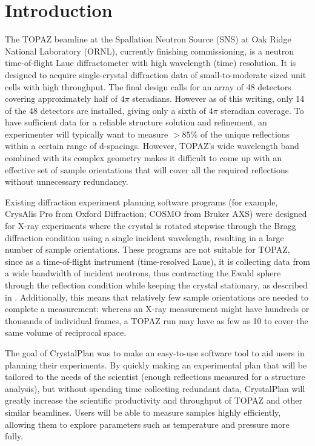 \documentclass[final]{iucr}              %
\begin{document}
\section{Introduction}

The TOPAZ beamline at the Spallation Neutron Source (SNS) at Oak Ridge National
Laboratory (ORNL), currently finishing commissioning, is a neutron
time-of-flight Laue diffractometer with high wavelength (time) resolution. It
is designed to acquire single-crystal diffraction data of small-to-moderate sized unit cells with  high
throughput. The final design calls for an array of 48 detectors covering
approximately half of $4\pi$ steradians. However as of this writing, only 14 of
the 48 detectors are installed, giving only a sixth of $4\pi$ steradian
coverage. To have sufficient data for a reliable structure solution and  
refinement, an experimenter will typically want to measure $ > 85\%$ of the
unique reflections within a certain range of d-spacings. However, TOPAZ's wide 
wavelength band combined with its complex geometry makes it difficult to come up
with  an effective set of sample orientations that will cover all the required
reflections without unnecessary redundancy. 


Existing diffraction experiment planning software programs (for example,
CrysAlis Pro from Oxford Diffraction; COSMO from Bruker AXS) were designed for
X-ray experiments where the crystal is rotated stepwise through the Bragg
diffraction condition using a single incident wavelength, 
resulting in a large number of sample orientations.
These programs are not suitable for TOPAZ, since as a time-of-flight instrument
(time-resolved Laue), it is collecting data from a wide
bandwidth of incident neutrons, thus contracting the Ewald sphere through the
reflection condition while keeping the crystal stationary, as described in
\cite{Schultz94,Wilson00}.
 Additionally, this means that relatively few sample
orientations are needed to complete a measurement: whereas an X-ray measurement might have
hundreds or thousands of individual frames, a TOPAZ run may have as few as 10
to cover the same volume of reciprocal space.


The goal of CrystalPlan was to make an easy-to-use software tool to aid users in
planning their experiments. By quickly making an experimental plan that will be
tailored to the needs of the scientist (enough reflections measured for a structure
analysis), but without spending time collecting redundant data, CrystalPlan will
greatly increase the scientific productivity and throughput of TOPAZ and other
similar beamlines. Users will be able to measure samples highly efficiently,
allowing them to explore parameters such as temperature and pressure more fully.
 
\end{document}
